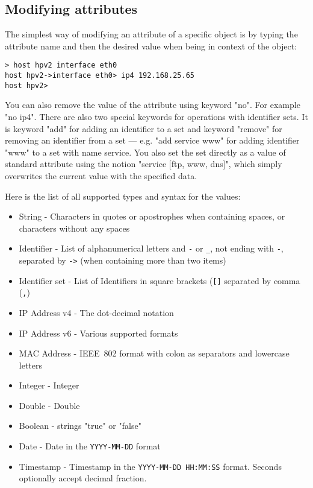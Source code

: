 \documentclass[deska]{subfiles}
\begin{document}
\subsection{Modifying attributes}

The simplest way of modifying an attribute of a specific object is by typing the attribute name and then the desired value
when being in context of the object:

\begin{verbatim}
> host hpv2 interface eth0
host hpv2->interface eth0> ip4 192.168.25.65
host hpv2>
\end{verbatim}

You can also remove the value of the attribute using keyword "no". For example "no ip4". There are also two special
keywords for operations with identifier sets. It is keyword "add" for adding an identifier to a set and keyword
"remove" for removing an identifier from a set --- e.g. "add service www" for adding identifier "www" to a set
with name service. You also set the set directly as a value of standard attribute using the notion "service [ftp, www,
dns]", which simply overwrites the current value with the specified data.

Here is the list of all supported types and syntax for the values:

\begin{itemize}
    \item{String} - Characters in quotes or apostrophes when containing spaces, or characters without any spaces
    \item{Identifier} - List of alphanumerical letters and {\tt -} or {\tt \_}, not ending with {\tt -}, separated by
        {\tt ->} (when containing more than two items)
    \item{Identifier set} - List of Identifiers in square brackets ({\tt []} separated by comma ({\tt ,})
    \item{IP Address v4} - The dot-decimal notation~\cite{ipv4-dot-decimal}
    \item{IP Address v6} - Various supported formats~\cite{rfc5952}
    \item{MAC Address} - IEEE~802 format with colon as separators and lowercase letters
    \item{Integer} - Integer
    \item{Double} - Double
    \item{Boolean} - strings "true" or "false"
    \item{Date} - Date in the {\tt YYYY-MM-DD} format
    \item{Timestamp} - Timestamp in the {\tt YYYY-MM-DD HH:MM:SS} format.  Seconds optionally accept decimal fraction.
\end{itemize}
\end{document}
